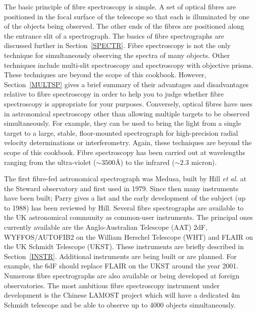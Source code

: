 \documentclass[chapters,twoside,11pt]{starlink}
\begin{document}
The basic principle of fibre spectroscopy is simple.  A set of optical
fibres are positioned in the focal surface of the telescope so that
each is illuminated by one of the objects being observed.  The other
ends of the fibres are positioned along the entrance slit of a
spectrograph.  The basics of fibre spectrographs are discussed further in
Section~\ref{SPECTR}.  Fibre spectroscopy is not the only technique for
simultaneously observing the spectra of many objects.  Other techniques
include multi-slit spectroscopy and spectroscopy with objective prisms.
These techniques are beyond the scope of this cookbook.  However,
Section~\ref{MULTSP} gives a brief summary of their advantages and
disadvantages relative to fibre spectroscopy in order to help you to
judge whether fibre spectroscopy is appropriate for your purposes.
Conversely, optical fibres have uses in astronomical spectroscopy other
than allowing multiple targets to be observed simultaneously.  For
example, they can be used to bring the light from a single target to a
large, stable, floor-mounted spectrograph for high-precision radial
velocity determinations or interferometry.  Again, these techniques are
beyond the scope of this cookbook.  Fibre spectroscopy has been carried
out at wavelengths ranging from the ultra-violet ($\sim 3500$\AA) to
the infrared ($\sim 2.3$ micron).

The first fibre-fed astronomical spectrograph was Medusa, built by
Hill \textit{et al.}\/\cite{HILL80} at the Steward observatory and first
used in 1979.  Since then many instruments have been built;
Parry\cite{PARRY97} gives a list and the early development of the
subject (up to 1988) has been reviewed by Hill\cite{HILL88}.  Several
fibre spectrographs are available to the UK astronomical community
as common-user instruments.  The principal ones currently available are
the Anglo-Australian Telescope (AAT) 2dF, WYFFOS/AUTOFIB2 on the William
Herschel Telescope (WHT) and FLAIR on the UK Schmidt Telescope (UKST).
These instruments are briefly described in Section~\ref{INSTR}.
Additional instruments are being built or are planned.  For example, the
6dF\cite{PARKER98} should replace FLAIR on the UKST around the year
2001.  Numerous fibre spectrographs are also available or being
developed at foreign observatories.  The most ambitious fibre
spectroscopy instrument under development is the Chinese LAMOST
project\cite{CHU97} which will have a dedicated 4m Schmidt
telescope and be able to observe up to 4000 objects simultaneously.
\end{document}

